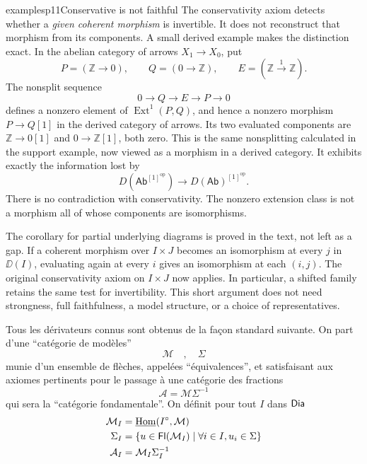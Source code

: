 \begin{dcomment}{examples}{p11}{Conservative is not faithful}
The conservativity axiom detects whether a \emph{given coherent morphism} is invertible. It does not reconstruct that morphism from its components. A small derived example makes the distinction exact. In the abelian category of arrows $X_1\to X_0$, put
\[
 P=(\mathbb Z\to0),\qquad Q=(0\to\mathbb Z),\qquad
 E=(\mathbb Z\xrightarrow{1}\mathbb Z).
\]
The nonsplit sequence
\[
 0\longrightarrow Q\longrightarrow E\longrightarrow P\longrightarrow0
\]
defines a nonzero element of $\operatorname{Ext}^1(P,Q)$, and hence a nonzero morphism $P\to Q[1]$ in the derived category of arrows. Its two evaluated components are $\mathbb Z\to0[1]$ and $0\to\mathbb Z[1]$, both zero. This is the same nonsplitting calculated in the support example, now viewed as a morphism in a derived category. It exhibits exactly the information lost by
\[
 D(\mathsf{Ab}^{[1]^{\mathrm{op}}})
 \longrightarrow D(\mathsf{Ab})^{[1]^{\mathrm{op}}}.
\]
There is no contradiction with conservativity. The nonzero extension class is not a morphism all of whose components are isomorphisms.

The corollary for partial underlying diagrams is proved in the text, not left as a gap. If a coherent morphism over $I\times J$ becomes an isomorphism at every $j$ in $\DD(I)$, evaluating again at every $i$ gives an isomorphism at each $(i,j)$. The original conservativity axiom on $I\times J$ now applies. In particular, a shifted family retains the same test for invertibility. This short argument does not need strongness, full faithfulness, a model structure, or a choice of representatives.
\end{dcomment}


Tous les dérivateurs connus sont obtenus de la façon standard suivante. On part d’une “catégorie de modèles”
\[
\mathcal{M} \quad , \quad \Sigma
\]
munie d’un ensemble de flèches, appelées “équivalences”, et satisfaisant aux axiomes pertinents pour le passage à une catégorie des fractions
\[
\mathcal{A} = \mathcal{M}\Sigma^{-1}
\]
qui sera la “catégorie fondamentale”. On définit pour tout $I$ dans $\mathsf{Dia}$
\[
\begin{aligned}
\mathcal{M}_I &= \underline{\operatorname{Hom}}(I^\circ,\mathcal{M}) \\
\Sigma_I &= \{u \in \mathsf{Fl}(\mathcal{M}_I) \mid \forall i \in I, u_i \in \Sigma\} \\
\mathcal{A}_I &= \mathcal{M}_I\Sigma_I^{-1}
\end{aligned}
\]

